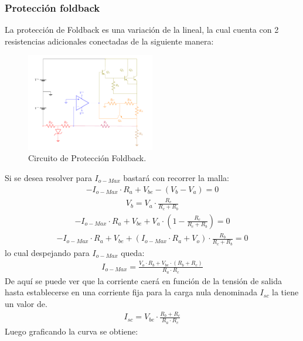\subsubsection{Protección foldback}
La protección de Foldback es una variación de la lineal, la cual cuenta con 2 resistencias adicionales conectadas de la siguiente manera:
\begin{figure}[H]
\centering
	\includegraphics[width=0.5\textwidth, page=2]{ImagenesEjercicio2/Regulador.pdf}
	\caption{Circuito de Protección Foldback.}
	\label{fig:circuitofoldback}
\end{figure}
Si se desea resolver para $I_{o-Max}$ bastará con recorrer la malla:
\begin{align}
-I_{o-Max} \cdot R_a + V_{be} - (V_b-V_a)=0
\end{align}
\begin{align}
V_b=V_a \cdot \frac{R_c}{R_c+R_b}
\end{align}
\begin{align}
-I_{o-Max} \cdot R_a + V_{be} + V_a \cdot (1-\frac{R_c}{R_c+R_b})=0
\end{align}
\begin{align}
-I_{o-Max} \cdot R_a + V_{be} + (I_{o-Max} \cdot R_a +V_o) \cdot \frac{R_b}{R_c+R_b}=0
\end{align}
lo cual despejando para $I_{o-Max}$ queda:
\begin{align}
I_{o-Max}=  \frac{V_o \cdot R_b + V_{be}\cdot (R_b+R_c)}{R_a \cdot R_c}
\label{eq:Imaxfoldback}
\end{align}
De aquí se puede ver que la corriente caerá en función de la tensión de salida hasta establecerse en una corriente fija para la carga nula denominada $I_{sc}$ la tiene un valor de.
\begin{align}
I_{sc} = V_{be} \cdot \frac{R_b+R_c}{R_a \cdot R_c}
\label{eq:Isc}
\end{align}
Luego graficando la curva se obtiene:
